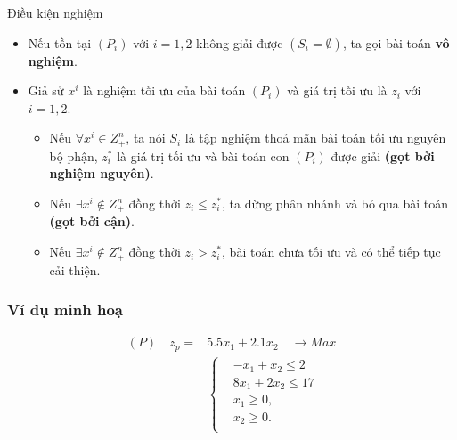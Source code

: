 \documentclass[12pt,a4paper]{report}
\begin{document}
{Điều kiện nghiệm}
\begin{itemize}
\item Nếu tồn tại $(P_i)$ với $i=1,2$ không giải được $(S_i = \emptyset )$, ta gọi bài toán \textbf{vô nghiệm}.
\item Giả sử $x^i$ là nghiệm tối ưu của bài toán $(P_i)$ và giá trị tối ưu là $z_i$ với $i = 1,2$.
\begin{itemize}
\item Nếu $\forall x^i \in Z^n_+$, ta nói $S_i$ là tập nghiệm thoả mãn bài toán tối ưu nguyên bộ phận, $z^*_i$ là giá trị tối ưu và bài toán con $(P_i)$ được giải \textbf{(gọt bởi nghiệm nguyên)}.
\item Nếu $\exists x^i \notin Z^n_+$ đồng thời $z_i \leq z^*_i$, ta dừng phân nhánh và bỏ qua bài toán \textbf{(gọt bởi cận)}.
\item Nếu $\exists x^i \notin Z^n_+$ đồng thời $z_i > z^*_i$, bài toán chưa tối ưu và có thể tiếp tục cải thiện.

\end{itemize}
\end{itemize}


\subsubsection*{Ví dụ minh hoạ}
    \begin{equation*}
        \begin{split}
            (P) \quad z_p= & 5.5x_1 + 2.1x_2 \quad \longrightarrow Max \\
            & \left\{\begin{split}
            & -x_1 + x_2 \leq 2 \\
            & 8x_1 + 2x_2 \leq 17 \\
            &x_1 \geq 0, \\
            &x_2 \geq 0. \\
            \end{split}\right. \\
        \end{split}
    \end{equation*}
\end{document}

